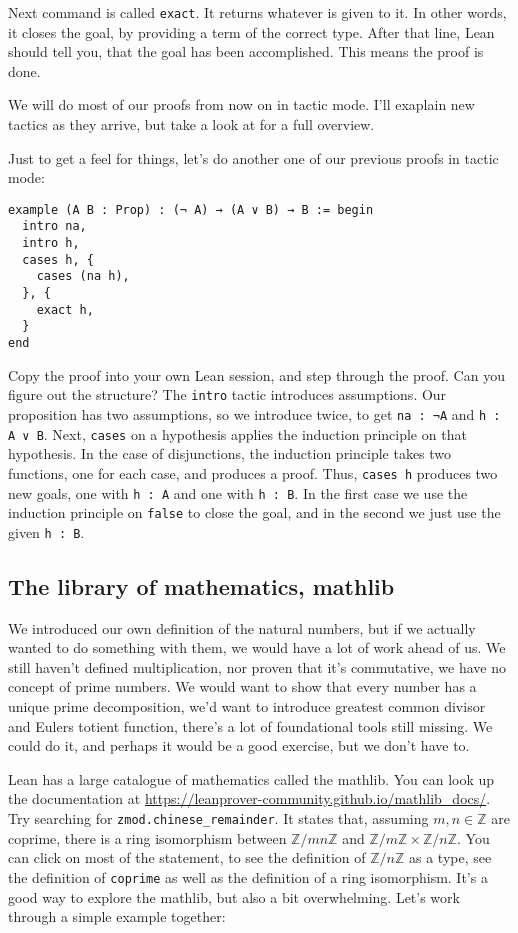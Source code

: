 \documentclass[a4paper, 12pt]{article}
\newcommand{\Z}{\mathbb{Z}}
\newcommand{\lean}[1]{\texttt{#1}}
\theoremstyle{changedot}
\theoremstyle{changedotbreak}
\theoremstyle{nonumberplain}
\begin{document}
Next command is called \lean{exact}. It returns whatever is given to it. In other words, it closes the goal, by providing a term of the correct type. After that line, Lean should tell you, that the goal has been accomplished. This means the proof is done.

We will do most of our proofs from now on in tactic mode. I'll exaplain new tactics as they arrive, but take a look at \cite{TacticRef} for a full overview.

Just to get a feel for things, let's do another one of our previous proofs in tactic mode:

\begin{verbatim}
example (A B : Prop) : (¬ A) → (A ∨ B) → B := begin
  intro na,
  intro h,
  cases h, { 
    cases (na h),
  }, {
    exact h, 
  }
end
\end{verbatim}

Copy the proof into your own Lean session, and step through the proof. Can you figure out the structure? The \lean{intro} tactic introduces assumptions. Our proposition has two assumptions, so we introduce twice, to get \lean{na : ¬A} and \lean{h : A ∨ B}. Next, \lean{cases} on a hypothesis applies the induction principle on that hypothesis. In the case of disjunctions, the induction principle takes two functions, one for each case, and produces a proof. Thus, \lean{cases h} produces two new goals, one with \lean{h : A} and one with \lean{h : B}. In the first case we use the induction principle on \lean{false} to close the goal, and in the second we just use the given \lean{h : B}.

\subsection{The library of mathematics, mathlib}
We introduced our own definition of the natural numbers, but if we actually wanted to do something with them, we would have a lot of work ahead of us. We still haven't defined multiplication, nor proven that it's commutative, we have no concept of prime numbers. We would want to show that every number has a unique prime decomposition, we'd want to introduce greatest common divisor and Eulers totient function, there's a lot of foundational tools still missing. We could do it, and perhaps it would be a good exercise, but we don't have to.

Lean has a large catalogue of mathematics called the mathlib. You can look up the documentation at {\footnotesize \url{https://leanprover-community.github.io/mathlib_docs/}}. Try searching for \lean{zmod.chinese_remainder}. It states that, assuming $m, n \in \Z$ are coprime, there is a ring isomorphism between $\Z/mn\Z$ and $\Z/m\Z \times \Z/n\Z$. You can click on most of the statement, to see the definition of $\Z/n\Z$ as a type, see the definition of \lean{coprime} as well as the definition of a ring isomorphism. It's a good way to explore the mathlib, but also a bit overwhelming. Let's work through a simple example together:
\end{document}

